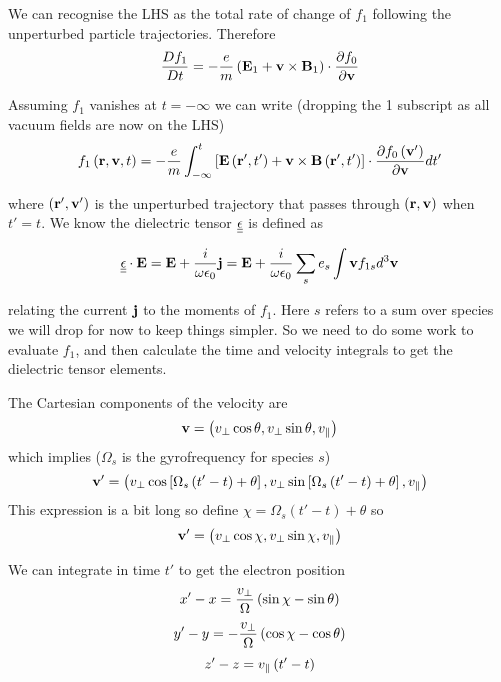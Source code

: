 We can recognise the LHS as the total rate of change of $f_1$ following the unperturbed particle trajectories. Therefore
\begin{equation}
	\frac{D f_1}{D t} = -\frac{e}{m} \left(\textbf{E}_1 + \textbf{v} \times \textbf{B}_1\right) \cdot \frac{\partial f_0}{\partial \textbf{v}}
\end{equation}

Assuming $f_1$ vanishes at $t=-\infty$ we can write (dropping the 1 subscript as all vacuum fields are now on the LHS)
\begin{equation}
	f_1 \left(\textbf{r}, \textbf{v}, t\right) = -\frac{e}{m} \int_{-\infty}^t \left[\textbf{E} \left(\textbf{r}', t'\right) + \textbf{v} \times \textbf{B}\left(\textbf{r}', t'\right) \right] \cdot \frac{\partial f_0 \left(\textbf{v}'\right)}{\partial \textbf{v}} dt'
\end{equation}

where $\left(\textbf{r}', \textbf{v}'\right)$ is the unperturbed trajectory that passes through $\left(\textbf{r}, \textbf{v}\right)$ when $t'=t$. We know the dielectric tensor $\underline{\underline{\epsilon}}$ is defined as

\begin{equation}\label{dielectric_tensor_def_kinetic_theory}
	\underline{\underline{\epsilon}}\cdot\textbf{E} = \textbf{E} + \frac{i}{\omega \epsilon_0}\textbf{j} = \textbf{E} + \frac{i}{\omega \epsilon_0} \sum_s e_s \int \textbf{v} f_{1s} d^3 \textbf{v}
\end{equation}

relating the current $\textbf{j}$ to the moments of $f_1$. Here $s$ refers to a sum over species we will drop for now to keep things simpler. So we need to do some work to evaluate $f_1$, and then calculate the time and velocity integrals to get the dielectric tensor elements.

The Cartesian components of the velocity are
\begin{equation}
	\textbf{v} = \left(v_\perp\cos\theta, v_\perp\sin\theta, v_\parallel\right)
\end{equation}
which implies ($\Omega_s$ is the gyrofrequency for species $s$)
\begin{equation}
	\textbf{v}' = \left(v_\perp\cos\left[\Omega_s\left(t'-t\right)+\theta\right], v_\perp\sin\left[\Omega_s\left(t'-t\right)+\theta\right], v_\parallel\right)
\end{equation}
This expression is a bit long so define $\chi =\Omega_s\left(t'-t\right)+\theta$ so
\begin{equation}
	\textbf{v}' = \left(v_\perp\cos\chi, v_\perp\sin\chi, v_\parallel\right)
\end{equation}

We can integrate in time $t'$ to get the electron position
\begin{equation}\label{electron_xposition}
	x'-x = \frac{v_\perp}{\Omega}\left( \sin\chi - \sin\theta\right)
\end{equation}
\begin{equation}\label{electron_yposition}
	y'-y = -\frac{v_\perp}{\Omega}\left( \cos\chi - \cos\theta\right)
\end{equation}
\begin{equation}\label{electron_zposition}
	z'-z=v_\parallel \left(t' - t\right)
\end{equation}


